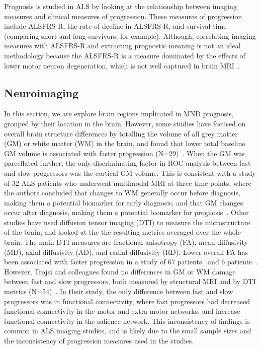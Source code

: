 Prognosis is studied in ALS by looking at the relationship between imaging measures and clinical measures of progression.
These measures of progression include ALSFRS-R, the rate of decline in ALSFRS-R, and survival time (comparing short and long survivors, for example).
Although, correlating imaging measures with ALSFRS-R and extracting prognostic meaning is not an ideal methodology because the ALSFRS-R is a measure dominated by the effects of lower motor neuron degeneration, which is not well captured in brain MRI~\cite{bedeLessonsALSImaging2014}.

\subsection{Neuroimaging}

In this section, we are explore brain regions implicated in MND prognosis, grouped by their location in the brain.
However, some studies have focused on overall brain structure differences by totalling the volume of all grey matter (GM) or white matter (WM) in the brain, and found that lower total baseline GM volume is associated with faster progression (N=29)~\cite{elmendiliAssociationBrainUpper2023}.
When the GM was parcellated further, the only discriminating factor in ROC analysis between fast and slow progressors was the cortical GM volume.
This is consistent with a study of 32 ALS patients who underwent multimodal MRI at three time points, where the authors concluded that changes to WM generally occur before diagnosis, making them a potential biomarker for early diagnosis, and that GM changes occur after diagnosis, making them a potential biomarker for prognosis~\cite{bedeLongitudinalStructuralChanges2018}.
Other studies have used diffusion tensor imaging (DTI) to measure the microstructure of the brain, and looked at the the resulting metrics averaged over the whole brain.
The main DTI measures are fractional anisotropy (FA), mean diffusivity (MD), axial diffusivity (AD), and radial diffusivity (RD).
Lower overall FA has been associated with faster progression in a study of 67 patients~\cite{sendaStructuralMRICorrelates2017} and 6 patients~\cite{baldaranovLongitudinalDiffusionTensor2017}.
However, Trojsi and colleagues found no differences in GM or WM damage between fast and slow progressors, both measured by structural MRI and by DTI metrics (N=54)~\cite{trojsiRestingStateFunctional2021}.
In their study, the only difference between fast and slow progressors was in functional connectivity, where fast progressors had decreased functional connectivity in the motor and extra-motor networks, and increase functional connectivity in the salience network.
This inconsistency of findings is common in ALS imaging studies, and is likely due to the small sample sizes and the inconsistency of progression measures used in the studies.

